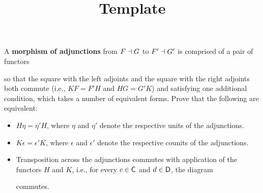 \documentclass[../../solutions]{subfiles}
\title{Template}
\author{}
\begin{document}
\maketitle

%

\begin{exercise}
  A \textbf{morphism of adjunctions} from $F\dashv G$ to $F'\dashv G'$
  is comprised of a pair of functors
  \begin{center}
  \end{center}
  so that the square with the left adjoints and the square with the
  right adjoints both commute (i.e., $KF=F'H$ and $HG=G'K$) and
  satisfying one additional condition, which takes a number of
  equivalent forms.  Prove that the following are equivalent:
  \begin{itemize}
  \item $H\eta=\eta'H$, where $\eta$ and $\eta'$ denote the respective
    units of the adjunctions.
  \item $K\epsilon=\epsilon'K$, where $\epsilon$ and $\epsilon'$
    denote the respective counits of the adjunctions.
  \item Transposition across the adjunctions commutes with application
    of the functors $H$ and $K$, i.e., for every $c\in{\mathsf{C}}$ and
    $d\in{\mathsf{D}}$, the diagram
    \begin{center}
    \end{center}
    commutes.
  \end{itemize}
\end{exercise}
\end{document}
